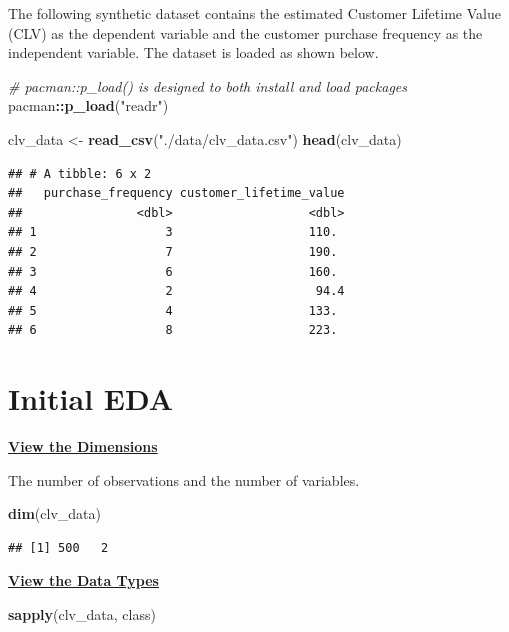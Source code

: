 \documentclass[
]{article}
\newenvironment{Shaded}{\begin{snugshade}}{\end{snugshade}}
\newcommand{\CommentTok}[1]{\textcolor[rgb]{0.56,0.35,0.01}{\textit{#1}}}
\newcommand{\FunctionTok}[1]{\textcolor[rgb]{0.13,0.29,0.53}{\textbf{#1}}}
\newcommand{\NormalTok}[1]{#1}
\newcommand{\OtherTok}[1]{\textcolor[rgb]{0.56,0.35,0.01}{#1}}
\newcommand{\SpecialCharTok}[1]{\textcolor[rgb]{0.81,0.36,0.00}{\textbf{#1}}}
\newcommand{\StringTok}[1]{\textcolor[rgb]{0.31,0.60,0.02}{#1}}
\begin{document}
The following synthetic dataset contains the estimated Customer Lifetime
Value (CLV) as the dependent variable and the customer purchase
frequency as the independent variable. The dataset is loaded as shown
below.

\begin{Shaded}
\begin{Highlighting}[]
\CommentTok{\# \textasciigrave{}pacman::p\_load()\textasciigrave{} is designed to both install and load packages}
\NormalTok{pacman}\SpecialCharTok{::}\FunctionTok{p\_load}\NormalTok{(}\StringTok{"readr"}\NormalTok{)}

\NormalTok{clv\_data }\OtherTok{\textless{}{-}} \FunctionTok{read\_csv}\NormalTok{(}\StringTok{"./data/clv\_data.csv"}\NormalTok{)}
\FunctionTok{head}\NormalTok{(clv\_data)}
\end{Highlighting}
\end{Shaded}

\begin{verbatim}
## # A tibble: 6 x 2
##   purchase_frequency customer_lifetime_value
##                <dbl>                   <dbl>
## 1                  3                   110. 
## 2                  7                   190. 
## 3                  6                   160. 
## 4                  2                    94.4
## 5                  4                   133. 
## 6                  8                   223.
\end{verbatim}

\section{Initial EDA}\label{initial-eda}

\ul{\textbf{View the Dimensions}}

The number of observations and the number of variables.

\begin{Shaded}
\begin{Highlighting}[]
\FunctionTok{dim}\NormalTok{(clv\_data)}
\end{Highlighting}
\end{Shaded}

\begin{verbatim}
## [1] 500   2
\end{verbatim}

\ul{\textbf{View the Data Types}}

\begin{Shaded}
\begin{Highlighting}[]
\FunctionTok{sapply}\NormalTok{(clv\_data, class)}
\end{Highlighting}
\end{Shaded}
\end{document}
